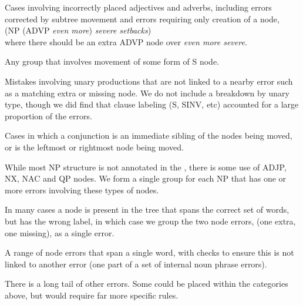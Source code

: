 \begin{description}\itemsep1pt

	\item[ Modifier Attachment] Cases involving incorrectly placed adjectives
	and adverbs, including errors corrected by subtree movement and errors
	requiring only creation of a node, \eg \\ (NP (ADVP \emph{even more})
	\emph{severe setbacks}) \\ where there should be an extra ADVP node over
	\emph{even more severe}.
	\item[ Clause Attachment] Any group that involves movement of some form of
	S node.

	\item[ Unary] Mistakes involving unary productions that are not linked to
	a nearby error  such as a matching extra or missing node.  We do not include
	a breakdown by unary type, though we did find that clause labeling (S, SINV,
	etc) accounted for a large proportion of the errors.

	\item[ Coordination] Cases in which a conjunction is an immediate sibling
	of the nodes being moved, or is the leftmost or rightmost node being moved.

	\item[ NP Internal Structure]  While most NP structure is not annotated in
	the \ptb, there is some use of ADJP, NX, NAC and QP nodes.  We form a single
	group for each NP that has one or more errors involving these types of nodes.

	\item[ Different label] In many cases a node is present in the tree that
	spans the correct set of words, but has the wrong label, in which case we
	group the two node errors, (one extra, one missing), as a single error.

	\item[ Single word phrase] A range of node errors that span a single word,
	with checks to ensure this is not linked to another error (\eg one part of a
	set of internal noun phrase errors).

	\item[ Other] There is a long tail of other errors.  Some could be placed
	within the categories above, but would require far more specific rules.
\end{description}

